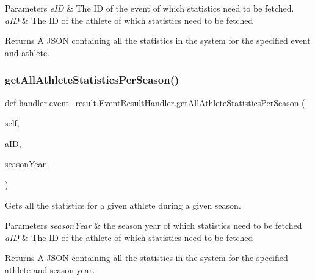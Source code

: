\begin{DoxyParams}{Parameters}
{\em e\+ID} & The ID of the event of which statistics need to be fetched. \\
\hline
{\em a\+ID} & The ID of the athlete of which statistics need to be fetched\\
\hline
\end{DoxyParams}
\begin{DoxyReturn}{Returns}
A J\+S\+ON containing all the statistics in the system for the specified event and athlete. 
\end{DoxyReturn}
\mbox{\label{classhandler_1_1event__result_1_1_event_result_handler_a33321729627e6c89b2fefd9a9f81c5d0}} 
\subsubsection{\texorpdfstring{get\+All\+Athlete\+Statistics\+Per\+Season()}{getAllAthleteStatisticsPerSeason()}}
{\footnotesize\ttfamily def handler.\+event\+\_\+result.\+Event\+Result\+Handler.\+get\+All\+Athlete\+Statistics\+Per\+Season (\begin{DoxyParamCaption}\item[{}]{self,  }\item[{}]{a\+ID,  }\item[{}]{season\+Year }\end{DoxyParamCaption})}



Gets all the statistics for a given athlete during a given season. 


\begin{DoxyParams}{Parameters}
{\em season\+Year} & the season year of which statistics need to be fetched \\
\hline
{\em a\+ID} & The ID of the athlete of which statistics need to be fetched\\
\hline
\end{DoxyParams}
\begin{DoxyReturn}{Returns}
A J\+S\+ON containing all the statistics in the system for the specified athlete and season year. 
\end{DoxyReturn}
\mbox{\label{classhandler_1_1event__result_1_1_event_result_handler_a0ab18f966bc1cb20c2efda7b917f6e31}} 
